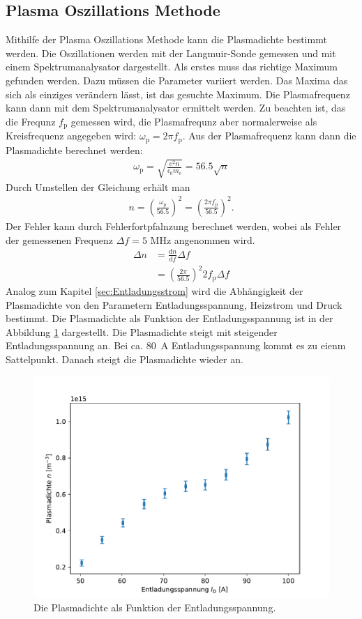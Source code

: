 \subsection{Plasma Oszillations Methode}
Mithilfe der Plasma  Oszillations Methode kann die Plasmadichte bestimmt werden. Die Oszillationen werden mit der Langmuir-Sonde gemessen und mit einem Spektrumanalysator dargestellt. Als erstes muss das richtige Maximum gefunden werden. Dazu müssen die Parameter variiert werden. Das Maxima das sich als einziges verändern lässt, ist das gesuchte Maximum. Die Plasmafrequenz kann dann mit dem Spektrumanalysator ermittelt werden. Zu beachten ist, das die Frequnz $f_{\mathrm{p}}$ gemessen wird, die Plasmafrequnz aber normalerweise als Kreisfrequenz angegeben wird: $\omega_{\mathrm{p}}= 2 \pi f_{\mathrm{p}}$.  Aus der Plasmafrequenz  kann dann die Plasmadichte berechnet werden:
\begin{align}
  \omega_{\mathrm{p}}=\sqrt{\frac{e^2 n}{\epsilon_0 m_{\mathrm{e}}}} = 56.5 \sqrt{n}
\end{align}
Durch Umstellen der Gleichung erhält man
\begin{align}
  n=\left( \frac{\omega_{\mathrm{p}}}{56.5} \right)^2=\left( \frac{2 \pi f_{\mathrm{p}}}{56.5} \right)^2.
 \end{align}
Der Fehler kann durch Fehlerfortpfalnzung berechnet werden, wobei als Fehler der gemessenen Frequenz  $\Delta f= 5$ MHz angenommen wird.  
\begin{align}
  \Delta n &= \frac{\mathrm{d} n}{\mathrm{d} f} \Delta f \\
  &=\left( \frac{2 \pi}{56.5} \right)^2 2 f_{\mathrm{p}} \Delta f
\end{align}
Analog zum Kapitel \ref{sec:Entladungsstrom} wird die Abhängigkeit der Plasmadichte von den Parametern Entladungsspannung, Heizstrom und Druck bestimmt. Die Plasmadichte als Funktion der Entladungsspannung ist in der Abbildung \ref{fig:3_2_Spannung} dargestellt. Die Plasmadichte steigt mit steigender Entladungsspannung an. Bei ca. \SI{80}{A} Entladungsspannung kommt es zu eienm Sattelpunkt. Danach steigt die Plasmadichte wieder an. 
\begin{figure}[H]
\centering
\includegraphics[scale=0.6]{3_2_Spannung.pdf}
\caption{Die Plasmadichte  als Funktion der Entladungsspannung.}
\label{fig:3_2_Spannung}
\end{figure}
